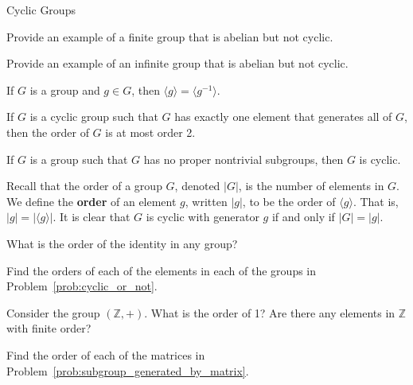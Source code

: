 \begin{section}{Cyclic Groups}
\begin{problem}\label{prob:abelian_does_not_imply_cyclic}
Provide an example of a finite group that is abelian but not cyclic.
\end{problem}

\begin{problem}
Provide an example of an infinite group that is abelian but not cyclic.
\end{problem}

\begin{theorem}\label{thm:subgroup_generated_by_inverse}
If $G$ is a group and $g\in G$, then $\langle g\rangle=\langle g^{-1}\rangle$.
\end{theorem}

\begin{theorem}
If $G$ is a cyclic group such that $G$ has exactly one element that generates all of $G$, then the order of $G$ is at most order 2.   
\end{theorem}

\begin{theorem}
If $G$ is a group such that $G$ has no proper nontrivial subgroups, then $G$ is cyclic.
\end{theorem}

Recall that the order of a group $G$, denoted $|G|$, is the number of elements in $G$. We define the \textbf{order} of an element $g$, written $|g|$, to be the order of $\langle g\rangle$.  That is, $|g|=|\langle g\rangle|$.  It is clear that $G$ is cyclic with generator $g$ if and only if $|G|=|g|$.

\begin{problem}
What is the order of the identity in any group?
\end{problem}

\begin{problem}\label{prob:computing_orders}
Find the orders of each of the elements in each of the groups in Problem~\ref{prob:cyclic_or_not}.
\end{problem}

\begin{problem}
Consider the group $(\mathbb{Z},+)$.  What is the order of 1?  Are there any elements in $\mathbb{Z}$ with finite order?
\end{problem}

\begin{problem}
Find the order of each of the matrices in Problem~\ref{prob:subgroup_generated_by_matrix}.
\end{problem}


\end{section}
